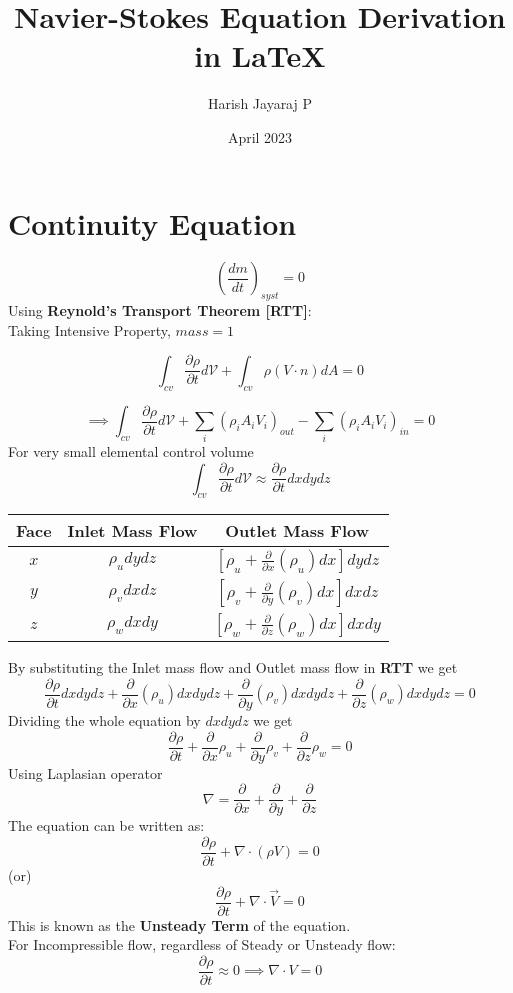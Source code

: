 \documentclass{article}
\title{Navier-Stokes Equation Derivation in LaTeX}
\author{\Large Harish Jayaraj P}
\date{April 2023}
\begin{document}
\doublespacing
\maketitle

\section*{Continuity Equation}

$$\left (\frac{dm}{dt}\right)_{syst}=0$$
Using \textbf{Reynold's Transport Theorem [RTT]}:\\
Taking Intensive Property, $mass=1$ 

$$ \int_{cv} \frac{\partial{\rho}}{\partial{t}}d\mathcal{V}+\int_{cv} \rho(V\cdot n)dA =0 $$

$$ \implies \int_{cv} \frac{\partial{\rho}}{\partial{t}}d\mathcal{V}+\sum_i(\rho_iA_iV_i)_{out}-\sum_i(\rho_iA_iV_i)_{in} =0 $$
For very small elemental control volume
$$\int_{cv}\frac{\partial{\rho}}{\partial{t}}d\mathcal{V}\approx\frac{\partial{\rho}}{\partial{t}}dxdydz$$
\begin{center}
\begin{tabular}{c c c}
\hline
     \textbf{Face} & \textbf{Inlet Mass Flow} & \textbf{Outlet Mass Flow} \\ \hline
     $x$ & $\rho_udydz$ &  $\left [\rho_u+\frac{\partial{}}{\partial{x}}{(\rho_u)dx}\right]dydz$ \\ 
     $y$ & $\rho_vdxdz$ &  $\left [\rho_v+\frac{\partial{}}{\partial{y}}{(\rho_v)dx}\right]dxdz$ \\ 
     $z$ & $\rho_wdxdy$ &  $\left [\rho_w+\frac{\partial{}}{\partial{z}}{(\rho_w)dx}\right]dxdy$ \\ \hline
\end{tabular}
\end{center}
By substituting the Inlet mass flow and Outlet mass flow in \textbf{RTT} we get
\begin{equation*} 
\frac{\partial{\rho}}{\partial{t}}dxdydz+\frac{\partial}{\partial{x}}(\rho_u)dxdydz+\frac{\partial}{\partial{y}}(\rho_v)dxdydz+\frac{\partial}{\partial{z}}(\rho_w)dxdydz = 0 
\end{equation*}
Dividing the whole equation by $dxdydz$ we get
\begin{equation*}
\frac{\partial{\rho}}{\partial{t}}+\frac{\partial}{\partial{x}}\rho_u+\frac{\partial}{\partial{y}}\rho_v+\frac{\partial}{\partial{z}}\rho_w = 0
\end{equation*}
Using Laplasian operator $$\nabla=\frac{\partial}{\partial{x}}+\frac{\partial}{\partial{y}}+\frac{\partial}{\partial{z}}$$ 
The equation can be written as:
$$\frac{\partial{\rho}}{\partial{t}}+\nabla\cdot(\rho V)=0$$ (or)
$$\frac{\partial{\rho}}{\partial{t}}+\nabla\cdot\Vec{V}=0$$
This is known as the \textbf{Unsteady Term} of the equation.\\
For Incompressible flow, regardless of Steady or Unsteady flow:
$$\frac{\partial{\rho}}{\partial{t}}\approx0 \implies \nabla\cdot V=0$$
\end{document}
